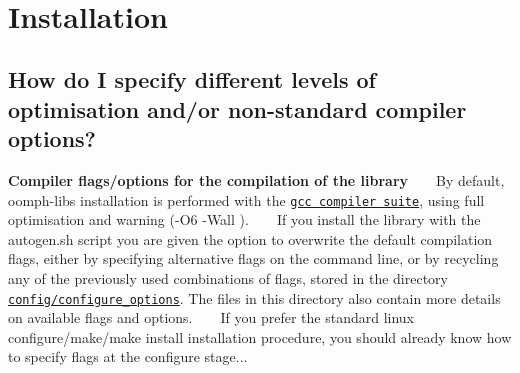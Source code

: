 ~\newline
~\newline


 

\hypertarget{index_installation}{}\section{Installation}\label{index_installation}
\hypertarget{index_comp_opt}{}\subsection{How do I specify different levels of optimisation and/or non-\/standard compiler options?}\label{index_comp_opt}

\begin{DoxyEnumerate}
\item {\bfseries Compiler flags/options for the compilation of the library} ~\newline
~\newline
 By default, {\ttfamily oomph-\/lib\textquotesingle{}s} installation is performed with the \href{http://gcc.gnu.org/}{\tt gcc compiler suite}, using full optimisation and warning ({\ttfamily -\/\+O6} {\ttfamily -\/\+Wall} ). ~\newline
~\newline
 If you install the library with the {\ttfamily autogen.\+sh} script you are given the option to overwrite the default compilation flags, either by specifying alternative flags on the command line, or by recycling any of the previously used combinations of flags, stored in the directory \href{../../../config/configure_options/}{\tt config/configure\+\_\+options}. The files in this directory also contain more details on available flags and options. ~\newline
~\newline
 If you prefer the standard linux {\ttfamily configure/make/make} {\ttfamily install} installation procedure, you should already know how to specify flags at the configure stage... ~\newline
~\newline


\end{DoxyEnumerate}

